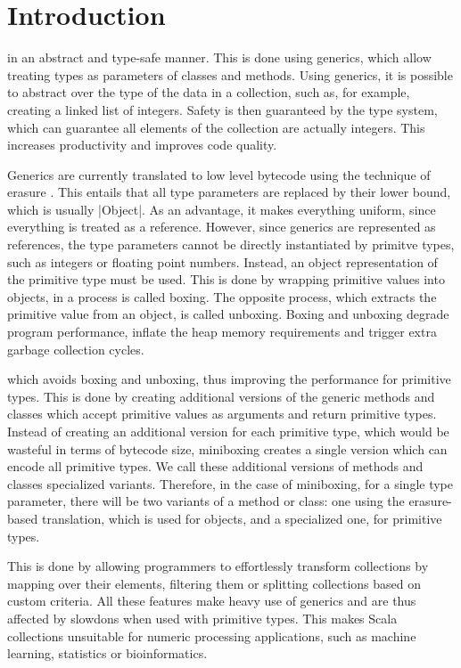 \section{Introduction}

 in an abstract and type-safe manner. This is done using generics, which allow treating types as parameters of classes and methods. Using generics, it is possible to abstract over the type of the data in a collection, such as, for example, creating a linked list of integers. Safety is then guaranteed by the type system, which can guarantee all elements of the collection are actually integers. This increases productivity and improves code quality.

Generics are currently translated to low level bytecode using the technique of erasure \cite{java-erasure}. This entails that all type parameters are replaced by their lower bound, which is usually |Object|. As an advantage, it makes everything uniform, since everything is treated as a reference. However, since generics are represented as references, the type parameters cannot be directly instantiated by primitve types, such as integers or floating point numbers. Instead, an object representation of the primitive type must be used. This is done by wrapping primitive values into objects, in a process is called boxing. The opposite process, which extracts the primitive value from an object, is called unboxing. Boxing and unboxing degrade program performance, inflate the heap memory requirements and trigger extra garbage collection cycles.

 which avoids boxing and unboxing, thus improving the performance for primitive types. This is done by creating additional versions of the generic methods and classes which accept primitive values as arguments and return primitive types. Instead of creating an additional version for each primitive type, which would be wasteful in terms of bytecode size, miniboxing creates a single version which can encode all primitive types. We call these additional versions of methods and classes specialized variants. Therefore, in the case of miniboxing, for a single type parameter, there will be two variants of a method or class: one using the erasure-based translation, which is used for objects, and a specialized one, for primitive types.

 This is done by allowing programmers to effortlessly transform collections by mapping over their elements, filtering them or splitting collections based on custom criteria. All these features make heavy use of generics and are thus affected by slowdons when used with primitive types. This makes Scala collections unsuitable for numeric processing applications, such as machine learning, statistics or bioinformatics.

